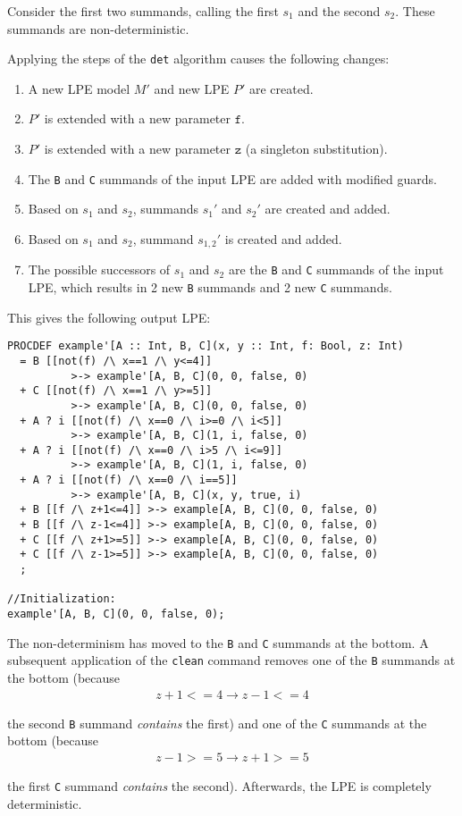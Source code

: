 Consider the first two summands, calling the first $s_1$ and the second $s_2$.
These summands are non-deterministic.

Applying the steps of the \texttt{det} algorithm causes the following changes:

\begin{enumerate}
\item A new LPE model $M'$ and new LPE $P'$ are created.
\item $P'$ is extended with a new parameter $\texttt{f}$.
\item $P'$ is extended with a new parameter $\texttt{z}$ (a singleton substitution).
\item The \texttt{B} and \texttt{C} summands of the input LPE are added with modified guards.
\item Based on $s_1$ and $s_2$, summands ${s_1}'$ and ${s_2}'$ are created and added.
\item Based on $s_1$ and $s_2$, summand ${s_{1, 2}}'$ is created and added.
\item The possible successors of $s_1$ and $s_2$ are the \texttt{B} and \texttt{C} summands of the input LPE, which results in 2 new \texttt{B} summands and 2 new \texttt{C} summands.
\end{enumerate}

This gives the following output LPE:

\begin{lstlisting}
PROCDEF example'[A :: Int, B, C](x, y :: Int, f: Bool, z: Int)
  = B [[not(f) /\ x==1 /\ y<=4]]
          >-> example'[A, B, C](0, 0, false, 0)
  + C [[not(f) /\ x==1 /\ y>=5]]
          >-> example'[A, B, C](0, 0, false, 0)
  + A ? i [[not(f) /\ x==0 /\ i>=0 /\ i<5]]
          >-> example'[A, B, C](1, i, false, 0)
  + A ? i [[not(f) /\ x==0 /\ i>5 /\ i<=9]]
          >-> example'[A, B, C](1, i, false, 0)
  + A ? i [[not(f) /\ x==0 /\ i==5]]
          >-> example'[A, B, C](x, y, true, i)
  + B [[f /\ z+1<=4]] >-> example[A, B, C](0, 0, false, 0)
  + B [[f /\ z-1<=4]] >-> example[A, B, C](0, 0, false, 0)
  + C [[f /\ z+1>=5]] >-> example[A, B, C](0, 0, false, 0)
  + C [[f /\ z-1>=5]] >-> example[A, B, C](0, 0, false, 0)
  ;

//Initialization:
example'[A, B, C](0, 0, false, 0);
\end{lstlisting}

The non-determinism has moved to the \texttt{B} and \texttt{C} summands at the bottom.
A subsequent application of the \texttt{clean} command removes one of the \texttt{B} summands at the bottom (because
\begin{align*}
z+1<=4 \rightarrow z-1<=4
\end{align*}

the second \texttt{B} summand \emph{contains} the first) and one of the \texttt{C} summands at the bottom (because
\begin{align*}
z-1>=5 \rightarrow z+1>=5
\end{align*}

the first \texttt{C} summand \emph{contains} the second).
Afterwards, the LPE is completely deterministic.




